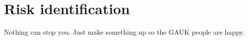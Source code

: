 \section{Risk identification}
Nothing can stop you. Just make something up so the GAUK people are happy.